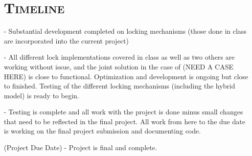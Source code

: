 \documentclass[finalProject.tex]{subfiles}
\begin{document}
\bigskip

\section*{\textsc{\Large Timeline}}

 - Substantial development completed on locking mechanisms (those done in class are incorporated into the current project)

\smallskip

 - All different lock implementations covered in class as well as two others are working without issue, and the joint solution in the case of (NEED A CASE HERE) is close to functional. Optimization and development is ongoing but close to finished. Testing of the different locking mechanisms (including the hybrid model) is ready to begin.

\smallskip

 - Testing is complete and all work with the project is done minus small changes that need to be reflected in the final project. All work from here to the due date is working on the final project submission and documenting code. 

\smallskip

 (Project Due Date) - Project is final and complete.
\end{document}
